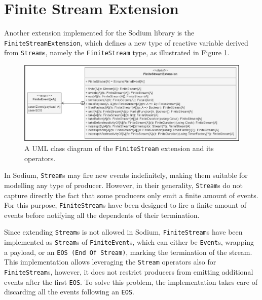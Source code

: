 
\section{Finite Stream Extension}
\label{section:implementation:finite-stream-extension}

Another extension implemented for the Sodium library is the
\texttt{FiniteStreamExten\-sion}, which defines a new type of reactive variable
derived from \texttt{Stream}s, namely the \texttt{Finite\-Stream} type, as
illustrated in Figure \ref{figure:finite-stream-extension-class-diagram}.

\begin{figure}[!ht]
  \centering
  \includegraphics[width=1\textwidth]{resources/figures/finite-stream-extension-class-diagram.png}
  \caption{A UML class diagram of the \texttt{FiniteStream} extension and its operators.}
  \label{figure:finite-stream-extension-class-diagram}
\end{figure}

In Sodium, \texttt{Stream}s may fire new events indefinitely, making them
suitable for modelling any type of producer. However, in their generality,
\texttt{Stream}s do not capture directly the fact that some producers only emit
a finite amount of events. For this purpose, \texttt{FiniteStream}s have been
designed to fire a finite amount of events before notifying all the dependents
of their termination.

Since extending \texttt{Stream}s is not allowed in Sodium,
\texttt{FiniteStream}s have been implemented as \texttt{Stream}s of
\texttt{FiniteEvent}s, which can either be \texttt{Event}s, wrapping a payload,
or an \texttt{EOS (End Of Stream)}, marking the termination of the stream. This
implementation allows leveraging the \texttt{Stream} operators also for
\texttt{FiniteStream}s, however, it does not restrict producers from emitting
additional events after the first \texttt{EOS}. To solve this problem, the
implementation takes care of discarding all the events following an
\texttt{EOS}.

